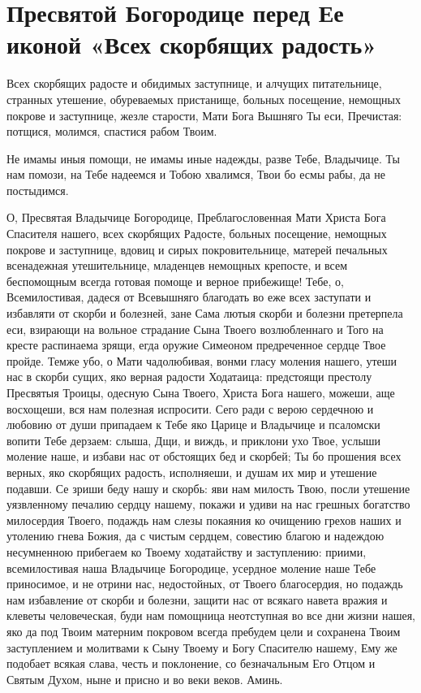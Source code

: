 \section{Пресвятой Богородице перед Ее иконой «Всех скорбящих радость»}\begin{mymulticols}


Всех скорбящих радосте и обидимых заступнице, и алчущих питательнице, странных утешение, обуреваемых пристанище, больных посещение, немощных покрове и заступнице, жезле старости, Мати Бога Вышняго Ты еси, Пречистая: потщися, молимся, спастися рабом Твоим.


Не имамы иныя помощи, не имамы иные надежды, разве Тебе, Владычице. Ты нам помози, на Тебе надеемся и Тобою хвалимся, Твои бо есмы рабы, да не постыдимся.


О, Пресвятая Владычице Богородице, Преблагословенная Мати Христа Бога Спасителя нашего, всех скорбящих Радосте, больных посещение, немощных покрове и заступнице, вдовиц и сирых покровительнице, матерей печальных всенадежная утешительнице, младенцев немощных крепосте, и всем беспомощным всегда готовая помоще и верное прибежище! Тебе, о, Всемилостивая, дадеся от Всевышняго благодать во еже всех заступати и избавляти от скорби и болезней, зане Сама лютыя скорби и болезни претерпела еси, взирающи на вольное страдание Сына Твоего возлюбленнаго и Того на кресте распинаема зрящи, егда оружие Симеоном предреченное сердце Твое пройде. Темже убо, о Мати чадолюбивая, вонми гласу моления нашего, утеши нас в скорби сущих, яко верная радости Ходатаица: предстоящи престолу Пресвятыя Троицы, одесную Сына Твоего, Христа Бога нашего, можеши, аще восхощеши, вся нам полезная испросити. Сего ради с верою сердечною и любовию от души припадаем к Тебе яко Царице и Владычице и псаломски вопити Тебе дерзаем: слыша, Дщи, и виждь, и приклони ухо Твое, услыши моление наше, и избави нас от обстоящих бед и скорбей; Ты бо прошения всех верных, яко скорбящих радость, исполняеши, и душам их мир и утешение подавши. Се зриши беду нашу и скорбь: яви нам милость Твою, посли утешение уязвленному печалию сердцу нашему, покажи и удиви на нас грешных богатство милосердия Твоего, подаждь нам слезы покаяния ко очищению грехов наших и утолению гнева Божия, да с чистым сердцем, совестию благою и надеждою несумненною прибегаем ко Твоему ходатайству и заступлению: приими, всемилостивая наша Владычице Богородице, усердное моление наше Тебе приносимое, и не отрини нас, недостойных, от Твоего благосердия, но подаждь нам избавление от скорби и болезни, защити нас от всякаго навета вражия и клеветы человеческая, буди нам помощница неотступная во все дни жизни нашея, яко да под Твоим матерним покровом всегда пребудем цели и сохранена Твоим заступлением и молитвами к Сыну Твоему и Богу Спасителю нашему, Ему же подобает всякая слава, честь и поклонение, со безначальным Его Отцом и Святым Духом, ныне и присно и во веки веков. Аминь.

\end{mymulticols}

